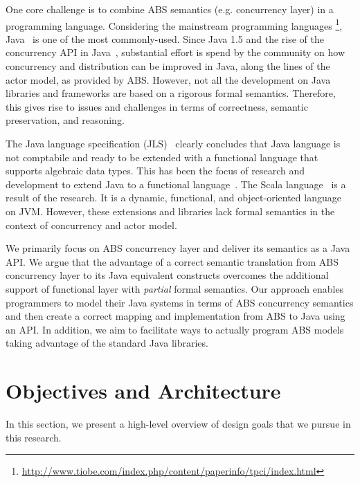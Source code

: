 One core challenge is to combine ABS semantics (e.g. concurrency layer) in a
programming language.
Considering the mainstream programming languages
\footnote{\url{http://www.tiobe.com/index.php/content/paperinfo/tpci/index.html}}, Java~\cite{gosling2000java} is one of the most commonly-used.
Since Java 1.5 and the rise of the concurrency API in Java~\cite{jsr166}, substantial effort is spend by the community on how concurrency and distribution can be improved in Java, along the lines of the actor model, as provided by ABS.
However, not all the development on Java libraries and frameworks are based on a rigorous formal semantics. 
Therefore, this gives rise to issues and challenges in terms of correctness, semantic preservation, and reasoning.

The Java language specification (JLS)~\cite{gosling2000java} clearly concludes that Java language is not comptabile and ready to be extended with a functional language that supports algebraic data types.
This has been the focus of research and development to extend Java to a functional language~\cite{odersky1997pizza,henkel2003discovering,nystrom2003polyglot,bracha1998making}.
The Scala language~\cite{odersky2004scala} is a result of the research. It is a dynamic, functional, and object-oriented language on JVM.
However, these extensions and libraries lack formal semantics in the context
of concurrency and actor model.

We primarily focus on ABS concurrency layer and deliver its semantics as a Java API.
We argue that the advantage of a correct semantic translation from ABS concurrency layer to its Java equivalent constructs overcomes the additional support of functional layer with \emph{partial} formal semantics.
Our approach enables programmers to model their Java systems in terms of ABS concurrency semantics and then create a correct mapping and implementation from ABS to Java using an API.
In addition, we aim to facilitate ways to actually program ABS models taking advantage of the standard Java libraries.

\section{Objectives and Architecture}
\label{sec:intro:arch:crit}

In this section, we present a high-level overview of design goals that we pursue in this research. 

